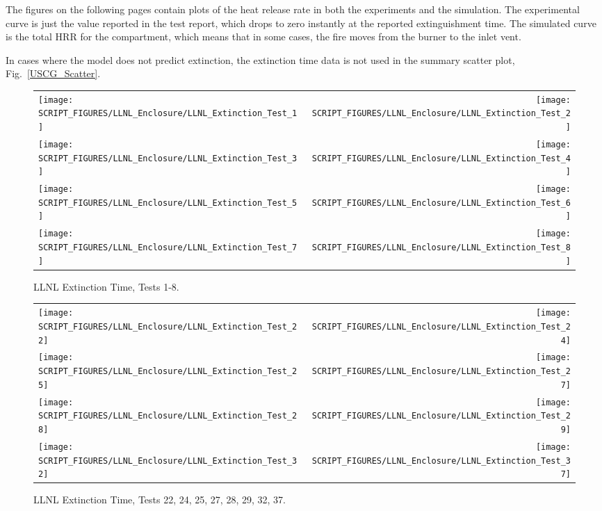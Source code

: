 The figures on the following pages contain plots of the heat release rate in both the experiments and the simulation. The experimental curve is just the value reported in the test report, which drops to zero instantly at the reported extinguishment time. The simulated curve is the total HRR for the compartment, which means that in some cases, the fire moves from the burner to the inlet vent.

In cases where the model does not predict extinction, the extinction time data is not used in the summary scatter plot, Fig.~\ref{USCG_Scatter}.

\newpage

\begin{figure}[p]
\begin{tabular*}{\textwidth}{l@{\extracolsep{\fill}}r}
\texttt{[image: SCRIPT\_FIGURES/LLNL\_Enclosure/LLNL\_Extinction\_Test\_1]} &
\texttt{[image: SCRIPT\_FIGURES/LLNL\_Enclosure/LLNL\_Extinction\_Test\_2]} \\
\texttt{[image: SCRIPT\_FIGURES/LLNL\_Enclosure/LLNL\_Extinction\_Test\_3]} &
\texttt{[image: SCRIPT\_FIGURES/LLNL\_Enclosure/LLNL\_Extinction\_Test\_4]} \\
\texttt{[image: SCRIPT\_FIGURES/LLNL\_Enclosure/LLNL\_Extinction\_Test\_5]} &
\texttt{[image: SCRIPT\_FIGURES/LLNL\_Enclosure/LLNL\_Extinction\_Test\_6]} \\
\texttt{[image: SCRIPT\_FIGURES/LLNL\_Enclosure/LLNL\_Extinction\_Test\_7]} &
\texttt{[image: SCRIPT\_FIGURES/LLNL\_Enclosure/LLNL\_Extinction\_Test\_8]}
\end{tabular*}
\caption{LLNL Extinction Time, Tests 1-8.}
\label{LLNL_Extinction_1}
\end{figure}

\begin{figure}[p]
\begin{tabular*}{\textwidth}{l@{\extracolsep{\fill}}r}
\texttt{[image: SCRIPT\_FIGURES/LLNL\_Enclosure/LLNL\_Extinction\_Test\_22]} &
\texttt{[image: SCRIPT\_FIGURES/LLNL\_Enclosure/LLNL\_Extinction\_Test\_24]} \\
\texttt{[image: SCRIPT\_FIGURES/LLNL\_Enclosure/LLNL\_Extinction\_Test\_25]} &
\texttt{[image: SCRIPT\_FIGURES/LLNL\_Enclosure/LLNL\_Extinction\_Test\_27]} \\
\texttt{[image: SCRIPT\_FIGURES/LLNL\_Enclosure/LLNL\_Extinction\_Test\_28]} &
\texttt{[image: SCRIPT\_FIGURES/LLNL\_Enclosure/LLNL\_Extinction\_Test\_29]} \\
\texttt{[image: SCRIPT\_FIGURES/LLNL\_Enclosure/LLNL\_Extinction\_Test\_32]} &
\texttt{[image: SCRIPT\_FIGURES/LLNL\_Enclosure/LLNL\_Extinction\_Test\_37]}
\end{tabular*}
\caption{LLNL Extinction Time, Tests 22, 24, 25, 27, 28, 29, 32, 37.}
\label{LLNL_Extinction_2}
\end{figure}

